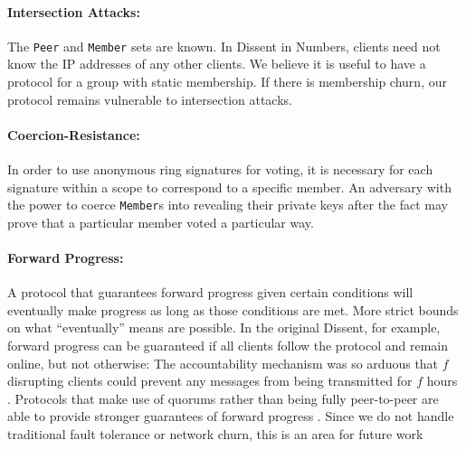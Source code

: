   \paragraph{Intersection Attacks:} The \texttt{Peer} and \texttt{Member} sets
  are known. In Dissent in Numbers, clients need not know the IP addresses of
  any other clients. We believe it is useful to have a protocol for a group with
  static membership.  If there is membership churn, our protocol remains
  vulnerable to intersection attacks.
  \paragraph{Coercion-Resistance:} In order to use anonymous ring signatures for
  voting, it is necessary for each signature within a scope to correspond to a
  specific member. An adversary with the power to coerce \texttt{Member}s into
  revealing their private keys after the fact may prove that a particular member
  voted a particular way\cite{lrs}.
  \paragraph{Forward Progress:} A protocol that guarantees forward progress
  given certain conditions will eventually make progress as long as those
  conditions are met. More strict bounds on what ``eventually'' means are
  possible. In the original Dissent, for example, forward progress can be
  guaranteed if all clients follow the protocol and remain online, but not
  otherwise: The accountability mechanism was so arduous that $f$ disrupting
  clients could prevent any messages from being transmitted for $f$ hours
  \cite{verdict}. Protocols that make use of quorums
  rather than being fully peer-to-peer are able to provide stronger guarantees
  of forward progress \cite{paxos}. Since we do not handle traditional fault
  tolerance or network churn,  this is an area
  for future work 
